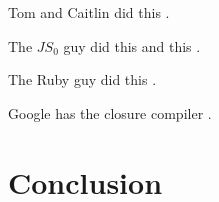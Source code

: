 \documentclass{article}
\begin{document}
Tom and Caitlin did this \cite{fwjsStruct}.

The $JS_0$ guy did this \cite{typeinferenceforjavascriptEcoop} and this \cite{typecheckingforjavascript}.

The Ruby guy did this \cite{typecheckingruby}.

Google has the closure compiler \cite{closureCompiler}.

\section{Conclusion}



\end{document}
